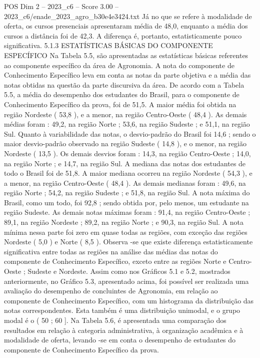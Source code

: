 \begin{textsample}{POS Dim 2 – 2023\_c6 – Score 3.00 – 2023\_c6/enade\_2023\_agro\_b30e4e3424.txt}
Já no que se refere à modalidade de oferta, os cursos presenciais apresentaram média de 48,0, enquanto a média dos cursos a distância foi de 42,3.
A diferença é, portanto, estatisticamente pouco significativa. 5.1.3 ESTATÍSTICAS BÁSICAS DO COMPONENTE ESPECÍFICO Na Tabela 5.5, são apresentadas as estatísticas básicas referentes ao componente específico da área de Agronomia.
A nota do componente de Conhecimento Específico leva em conta as notas da parte objetiva e a média das notas obtidas na questão da parte discursiva da área.
De acordo com a Tabela 5.5, a média do desempenho dos estudantes do Brasil, para o componente de Conhecimento Específico da prova, foi de 51,5.
A maior média foi obtida na região Nordeste ( 53,8 ), e a menor, na região Centro-Oeste ( 48,4 ).
As demais médias foram : 49,2, na região Norte ; 53,6, na região Sudeste ; e 51,1, na região Sul.
Quanto à variabilidade das notas, o desvio-padrão do Brasil foi 14,6 ; sendo o maior desvio-padrão observado na região Sudeste ( 14,8 ), e o menor, na região Nordeste ( 13,5 ).
Os demais desvios foram : 14,3, na região Centro-Oeste ; 14,0, na região Norte ; e 14,7, na região Sul.
A mediana das notas dos estudantes de todo o Brasil foi de 51,8.
A maior mediana ocorreu na região Nordeste ( 54,3 ), e a menor, na região Centro-Oeste ( 48,4 ).
As demais medianas foram : 49,6, na região Norte ; 54,2, na região Sudeste ; e 51,8, na região Sul.
A nota máxima do Brasil, como um todo, foi 92,8 ; sendo obtida por, pelo menos, um estudante na região Sudeste.
As demais notas máximas foram : 91,4, na região Centro-Oeste ; 89,1, na região Nordeste ; 89,2, na região Norte ; e 90,3, na região Sul.
A nota mínima nessa parte foi zero em quase todas as regiões, com exceção das regiões Nordeste ( 5,0 ) e Norte ( 8,5 ).
Observa -se que existe diferença estatisticamente significativa entre todas as regiões na análise das médias das notas do componente de Conhecimento Específico, exceto entre as regiões Norte e Centro-Oeste ; Sudeste e Nordeste.
Assim como nos Gráficos 5.1 e 5.2, mostrados anteriormente, no Gráfico 5.3, apresentado acima, foi possível ser realizada uma avaliação do desempenho de concluintes de Agronomia, em relação ao componente de Conhecimento Específico, com um histograma da distribuição das notas correspondentes.
Esta também é uma distribuição unimodal, e o grupo modal é o ( 50 ; 60 ].
Na Tabela 5.6, é apresentada uma comparação dos resultados em relação à categoria administrativa, à organização acadêmica e à modalidade de oferta, levando -se em conta o desempenho de estudantes do componente de Conhecimento Específico da prova.

\end{textsample}
